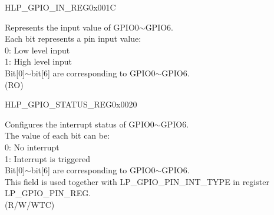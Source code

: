 \begin{register}{H}{LP\_GPIO\_IN\_REG}{0x001C}\label{regdesc:LPGPIOINREG}
%
%
\regnewline%
\begin{regdesc}\begin{reglist}
\label{fielddesc:LPGPIOINDATANEXT}\item [LP\_GPIO\_IN\_DATA\_NEXT] Represents the input value of GPIO0$\sim$GPIO6.\\
Each bit represents a pin input value:\\
0: Low level input\\
1: High level input\\
Bit[0]$\sim$bit[6] are corresponding to GPIO0$\sim$GPIO6.\\ (RO)
\end{reglist}\end{regdesc}
\end{register}


\begin{register}{H}{LP\_GPIO\_STATUS\_REG}{0x0020}\label{regdesc:LPGPIOSTATUSREG}
%
%
\regnewline%
\begin{regdesc}\begin{reglist}
\label{fielddesc:LPGPIOSTATUSINTERRUPT}\item [LP\_GPIO\_STATUS\_INTERRUPT] Configures the interrupt status of GPIO0$\sim$GPIO6.\\
The value of each bit can be:\\
0: No interrupt\\
1: Interrupt is triggered\\
Bit[0]$\sim$bit[6] are corresponding to GPIO0$\sim$GPIO6.\\
This field is used together with LP\_GPIO\_PIN\_INT\_TYPE in register LP\_GPIO\_PIN\_REG.\\
 (R/W/WTC)
\end{reglist}\end{regdesc}
\end{register}


